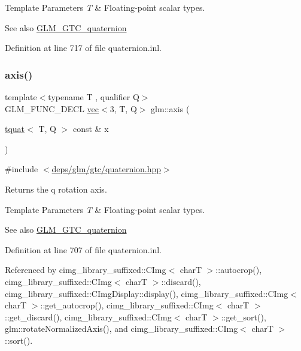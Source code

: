 \begin{DoxyTemplParams}{Template Parameters}
{\em T} & Floating-\/point scalar types.\\
\hline
\end{DoxyTemplParams}
\begin{DoxySeeAlso}{See also}
\hyperlink{group__gtc__quaternion}{G\+L\+M\+\_\+\+G\+T\+C\+\_\+quaternion} 
\end{DoxySeeAlso}


Definition at line 717 of file quaternion.\+inl.

\mbox{\label{group__gtc__quaternion_gaaf2707d3081789ce097daaa6e54d5287}} 
\subsubsection{\texorpdfstring{axis()}{axis()}}
{\footnotesize\ttfamily template$<$typename T , qualifier Q$>$ \\
G\+L\+M\+\_\+\+F\+U\+N\+C\+\_\+\+D\+E\+CL \hyperlink{structglm_1_1vec}{vec}$<$3, T, Q$>$ glm\+::axis (\begin{DoxyParamCaption}\item[{\hyperlink{structglm_1_1tquat}{tquat}$<$ T, Q $>$ const \&}]{x }\end{DoxyParamCaption})}



{\ttfamily \#include $<$\hyperlink{gtc_2quaternion_8hpp}{deps/glm/gtc/quaternion.\+hpp}$>$}

Returns the q rotation axis.


\begin{DoxyTemplParams}{Template Parameters}
{\em T} & Floating-\/point scalar types.\\
\hline
\end{DoxyTemplParams}
\begin{DoxySeeAlso}{See also}
\hyperlink{group__gtc__quaternion}{G\+L\+M\+\_\+\+G\+T\+C\+\_\+quaternion} 
\end{DoxySeeAlso}


Definition at line 707 of file quaternion.\+inl.



Referenced by cimg\+\_\+library\+\_\+suffixed\+::\+C\+Img$<$ char\+T $>$\+::autocrop(), cimg\+\_\+library\+\_\+suffixed\+::\+C\+Img$<$ char\+T $>$\+::discard(), cimg\+\_\+library\+\_\+suffixed\+::\+C\+Img\+Display\+::display(), cimg\+\_\+library\+\_\+suffixed\+::\+C\+Img$<$ char\+T $>$\+::get\+\_\+autocrop(), cimg\+\_\+library\+\_\+suffixed\+::\+C\+Img$<$ char\+T $>$\+::get\+\_\+discard(), cimg\+\_\+library\+\_\+suffixed\+::\+C\+Img$<$ char\+T $>$\+::get\+\_\+sort(), glm\+::rotate\+Normalized\+Axis(), and cimg\+\_\+library\+\_\+suffixed\+::\+C\+Img$<$ char\+T $>$\+::sort().

